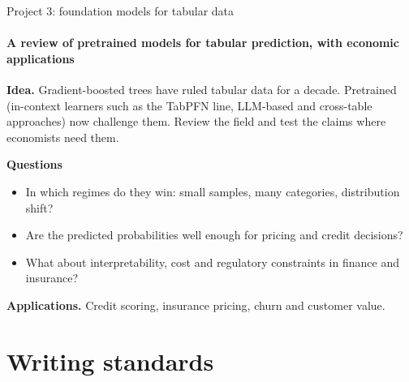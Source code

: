 \documentclass[aspectratio=169,11pt,t]{beamer}
\begin{document}
\begin{frame}{Project 3: foundation models for tabular data}
  \framesubtitle{A review of pretrained models for tabular prediction, with economic applications}
  \textbf{Idea.} Gradient-boosted trees have ruled tabular data for a decade. Pretrained
   (in-context learners such as the TabPFN line, LLM-based and
  cross-table approaches) now challenge them. Review the field and test the claims where
  economists need them.

  \medskip
  \textbf{Questions}
  \begin{itemize}
    \item In which regimes do they win: small samples, many categories, distribution shift?
    \item Are the predicted probabilities  well enough for pricing and credit decisions?
    \item What about interpretability, cost and regulatory constraints in finance and insurance?
  \end{itemize}

  \smallskip
  \textbf{Applications.} Credit scoring, insurance pricing, churn and customer value.

  \smallskip
\end{frame}

\section{Writing standards}
\end{document}
